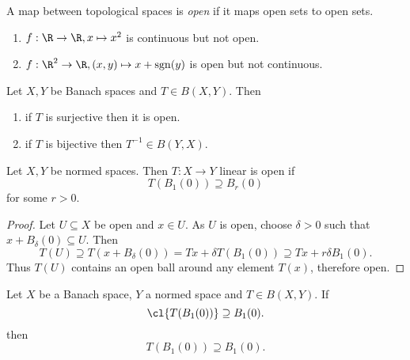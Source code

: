 \documentclass[a4paper]{article}
\begin{document}
\begin{definition}
  A map between topological spaces is \emph{open} if it maps open sets to open sets.
\end{definition}

\begin{eg}\leavevmode
  \begin{enumerate}
  \item \(f: \R\to \R, x \mapsto x^2\) is continuous but not open.
  \item \(f: \R^2 \to \R, (x, y) \mapsto x + \operatorname{sgn}(y)\) is open but not continuous.
  \end{enumerate}
\end{eg}

\begin{theorem}
  \label{thm:open mapping theorem}
  Let \(X, Y\) be Banach spaces and \(T \in B(X, Y)\). Then
  \begin{enumerate}
  \item if \(T\) is surjective then it is open.
  \item if \(T\) is bijective then \(T^{-1} \in B(Y, X)\).
  \end{enumerate}
\end{theorem}

\begin{lemma}
  Let \(X, Y\) be normed spaces. Then \(T: X \to Y\) linear is open if
  \[
    T(B_1(0)) \supseteq B_r(0)
  \]
  for some \(r > 0\).
\end{lemma}

\begin{proof}
  Let \(U \subseteq X\) be open and \(x \in U\). As \(U\) is open, choose \(\delta > 0\) such that \(x + B_\delta(0) \subseteq U\). Then
  \[
    T(U) \supseteq T(x + B_\delta(0)) = Tx + \delta T(B_1(0)) \supseteq Tx + r \delta B_1(0).
  \]
  Thus \(T(U)\) contains an open ball around any element \(T(x)\), therefore open.
\end{proof}

\begin{lemma}
  Let \(X\) be a Banach space, \(Y\) a normed space and \(T \in B(X, Y)\). If
  \[
    \cl{T(B_1(0))} \supseteq B_1(0).
  \]
  then
  \[
    T(B_1(0)) \supseteq B_1(0).
  \]
\end{lemma}
\end{document}
